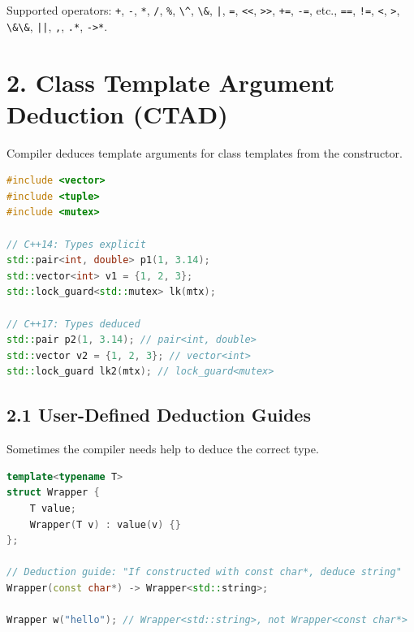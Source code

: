 Supported operators: \passthrough{\lstinline!+!},
\passthrough{\lstinline!-!}, \passthrough{\lstinline!*!},
\passthrough{\lstinline!/!}, \passthrough{\lstinline!\%!},
\passthrough{\lstinline!\^!}, \passthrough{\lstinline!\&!},
\passthrough{\lstinline!|!}, \passthrough{\lstinline!=!},
\passthrough{\lstinline!<<!}, \passthrough{\lstinline!>>!},
\passthrough{\lstinline!+=!}, \passthrough{\lstinline!-=!}, etc.,
\passthrough{\lstinline!==!}, \passthrough{\lstinline"!="},
\passthrough{\lstinline!<!}, \passthrough{\lstinline!>!},
\passthrough{\lstinline!\&\&!}, \passthrough{\lstinline!||!},
\passthrough{\lstinline!,!}, \passthrough{\lstinline!.*!},
\passthrough{\lstinline!->*!}.

\hypertarget{class-template-argument-deduction-ctad}{%
\section{2. Class Template Argument Deduction
(CTAD)}\label{class-template-argument-deduction-ctad}}

Compiler deduces template arguments for class templates from the
constructor.

\begin{lstlisting}[language={C++}]
#include <vector>
#include <tuple>
#include <mutex>

// C++14: Types explicit
std::pair<int, double> p1(1, 3.14);
std::vector<int> v1 = {1, 2, 3};
std::lock_guard<std::mutex> lk(mtx);

// C++17: Types deduced
std::pair p2(1, 3.14); // pair<int, double>
std::vector v2 = {1, 2, 3}; // vector<int>
std::lock_guard lk2(mtx); // lock_guard<mutex>
\end{lstlisting}

\hypertarget{user-defined-deduction-guides}{%
\subsection{2.1 User-Defined Deduction
Guides}\label{user-defined-deduction-guides}}

Sometimes the compiler needs help to deduce the correct type.

\begin{lstlisting}[language={C++}]
template<typename T>
struct Wrapper {
    T value;
    Wrapper(T v) : value(v) {}
};

// Deduction guide: "If constructed with const char*, deduce string"
Wrapper(const char*) -> Wrapper<std::string>;

Wrapper w("hello"); // Wrapper<std::string>, not Wrapper<const char*>
\end{lstlisting}

